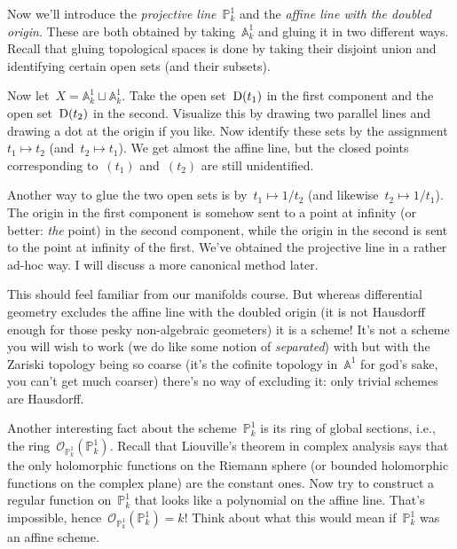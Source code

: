 \begin{example}
  \label{example:projective-line-doubled-origin}
  Now we'll introduce the \emph{projective line}~$\mathbb{P}^1_k$ and the \emph{affine line with the doubled origin}. These are both obtained by taking~$\mathbb{A}^1_k$ and gluing it in two different ways. Recall that gluing topological spaces is done by taking their disjoint union and identifying certain open sets (and their subsets).

  Now let~$X=\mathbb{A}^1_k\sqcup\mathbb{A}^1_k$. Take the open set~$\operatorname{D}(t_1)$ in the first component and the open set~$\operatorname{D}(t_2)$ in the second. Visualize this by drawing two parallel lines and drawing a dot at the origin if you like. Now identify these sets by the assignment~$t_1\mapsto t_2$ (and~$t_2\mapsto t_1$). We get almost the affine line, but the closed points corresponding to~$(t_1)$ and~$(t_2)$ are still unidentified.

  Another way to glue the two open sets is by~$t_1\mapsto 1/t_2$ (and likewise~$t_2\mapsto 1/t_1$). The origin in the first component is somehow sent to a point at infinity (or better: \emph{the} point) in the second component, while the origin in the second is sent to the point at infinity of the first. We've obtained the projective line in a rather ad-hoc way. I will discuss a more canonical method later.

  This should feel familiar from our manifolds course. But whereas differential geometry excludes the affine line with the doubled origin (it is not Hausdorff enough for those pesky non-algebraic geometers) it is a scheme! It's not a scheme you will wish to work (we do like some notion of \emph{separated}) with but with the Zariski topology being so coarse (it's the cofinite topology in~$\mathbb{A}^1$ for god's sake, you can't get much coarser) there's no way of excluding it: only trivial schemes are Hausdorff.

  Another interesting fact about the scheme~$\mathbb{P}^1_k$ is its ring of global sections, i.e., the ring~$\mathcal{O}_{\mathbb{P}^1_k}(\mathbb{P}^1_k)$. Recall that Liouville's theorem in complex analysis says that the only holomorphic functions on the Riemann sphere (or bounded holomorphic functions on the complex plane) are the constant ones. Now try to construct a regular function on~$\mathbb{P}^1_k$ that looks like a polynomial on the affine line. That's impossible, hence~$\mathcal{O}_{\mathbb{P}^1_k}(\mathbb{P}^1_k)=k$! Think about what this would mean if~$\mathbb{P}^1_k$ was an affine scheme.
\end{example}

